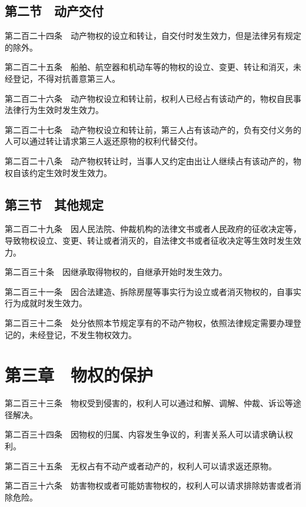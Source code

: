 \documentclass[UTF8,12pt,a4paper]{ctexbook}
\begin{document}
\subsection*{第二节　动产交付}

第二百二十四条　动产物权的设立和转让，自交付时发生效力，但是法律另有规定的除外。

第二百二十五条　船舶、航空器和机动车等的物权的设立、变更、转让和消灭，未经登记，不得对抗善意第三人。

第二百二十六条　动产物权设立和转让前，权利人已经占有该动产的，物权自民事法律行为生效时发生效力。

第二百二十七条　动产物权设立和转让前，第三人占有该动产的，负有交付义务的人可以通过转让请求第三人返还原物的权利代替交付。

第二百二十八条　动产物权转让时，当事人又约定由出让人继续占有该动产的，物权自该约定生效时发生效力。


\subsection*{第三节　其他规定}

第二百二十九条　因人民法院、仲裁机构的法律文书或者人民政府的征收决定等，导致物权设立、变更、转让或者消灭的，自法律文书或者征收决定等生效时发生效力。

第二百三十条　因继承取得物权的，自继承开始时发生效力。

第二百三十一条　因合法建造、拆除房屋等事实行为设立或者消灭物权的，自事实行为成就时发生效力。

第二百三十二条　处分依照本节规定享有的不动产物权，依照法律规定需要办理登记的，未经登记，不发生物权效力。

\section*{第三章　物权的保护}

第二百三十三条　物权受到侵害的，权利人可以通过和解、调解、仲裁、诉讼等途径解决。

第二百三十四条　因物权的归属、内容发生争议的，利害关系人可以请求确认权利。

第二百三十五条　无权占有不动产或者动产的，权利人可以请求返还原物。

第二百三十六条　妨害物权或者可能妨害物权的，权利人可以请求排除妨害或者消除危险。
\end{document}
